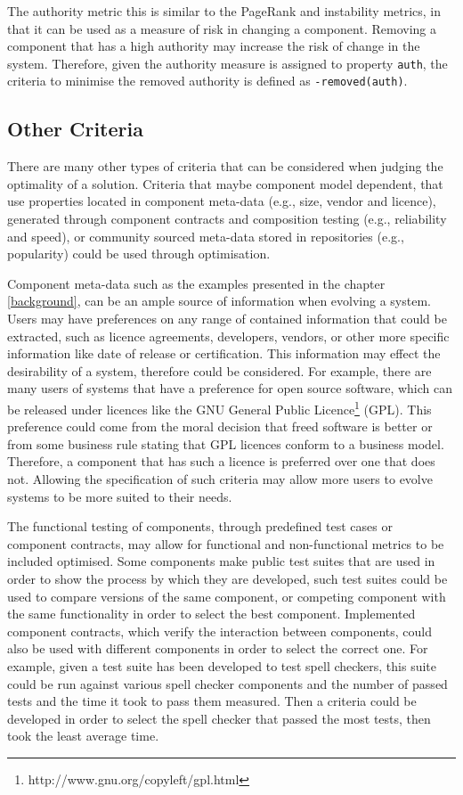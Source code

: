 The authority metric this is similar to the PageRank and instability metrics, in that it can be used as a measure of risk in changing a component.
Removing a component that has a high authority may increase the risk of change in the system.
Therefore, given the authority measure is assigned to property \verb+auth+, the criteria to minimise the removed authority is defined as \verb!-removed(auth)!.

\subsection{Other Criteria}
There are many other types of criteria that can be considered when judging the optimality of a solution.
Criteria that maybe component model dependent, that use properties located in component meta-data (e.g., size, vendor and licence),
generated through component contracts and composition testing (e.g., reliability and speed),
or community sourced meta-data stored in repositories (e.g., popularity) could be used through optimisation.

Component meta-data such as the examples presented in the chapter \ref{background}, can be an ample source of information when evolving a system.
Users may have preferences on any range of contained information that could be extracted, such as licence agreements, developers, vendors,
or other more specific information like date of release or certification.
This information may effect the desirability of a system, therefore could be considered. 
For example, there are many users of systems that have a preference for open source software, 
which can be released under licences like the GNU General Public Licence\footnote{http://www.gnu.org/copyleft/gpl.html} (GPL).
This preference could come from the moral decision that freed software is better or from some business rule stating that GPL licences conform to a business model.
Therefore, a component that has such a licence is preferred over one that does not.
Allowing the specification of such criteria may allow more users to evolve systems to be more suited to their needs.

The functional testing of components, through predefined test cases or component contracts, may allow for functional and non-functional metrics to be included optimised.
Some components make public test suites that are used in order to show the process by which they are developed,
such test suites could be used to compare versions of the same component, or competing component with the same functionality in order to select the best component.
Implemented component contracts, which verify the interaction between components, could also be used with different components in order to select the correct one. 
For example, given a test suite has been developed to test spell checkers, 
this suite could be run against various spell checker components and the number of passed tests and the time it took to pass them measured.
Then a criteria could be developed in order to select the spell checker that passed the most tests, then took the least average time.

